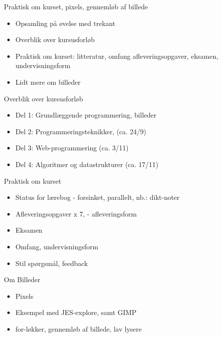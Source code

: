 \documentclass[a4paper,landscape]{slides}
\begin{document}
\begin{slide}
	\begin{center} {\large 
            Praktisk om kurset, pixels, gennemløb af billede
	} \end{center}
	\begin{itemize} \addtolength{\itemsep}{-\baselineskip}
		\item Opsamling på øvelse med trekant
		\item Overblik over kursusforløb
                \item Praktisk om kurset: litteratur, omfang
	                afleveringsopgaver, eksamen, undervisningsform
                \item Lidt mere om billeder
	\end{itemize}
\end{slide}

\begin{slide}
	\begin{center} {\large 
            Overblik over kursusforløb
	} \end{center}
	\begin{itemize} \addtolength{\itemsep}{-\baselineskip}
		\item Del 1: Grundlæggende programmering, billeder
		\item Del 2: Programmeringsteknikker, (ca. 24/9)
		\item Del 3: Web-programmering (ca. 3/11)
		\item Del 4: Algoritmer og datastrukturer (ca. 17/11)
	\end{itemize}
\end{slide}

\begin{slide}
	\begin{center} {\large 
            Praktisk om kurset
	} \end{center}
	\begin{itemize} \addtolength{\itemsep}{-\baselineskip}
		\item Status for lærebog - forsinket, parallelt, nb.: dikt-noter
		\item Afleveringsopgaver x 7, - afleveringsform
		\item Eksamen
		\item Omfang, undervisningsform
                \item Stil spørgsmål, feedback
	\end{itemize}
\end{slide}

\begin{slide}
	\begin{center} {\large 
            Om Billeder
	} \end{center}
	\begin{itemize} \addtolength{\itemsep}{-\baselineskip}
		\item Pixels
		\item Eksempel med JES-explore, samt GIMP
		\item for-løkker, gennemløb af billede, lav lysere
	\end{itemize}
\end{slide}
\end{document}
